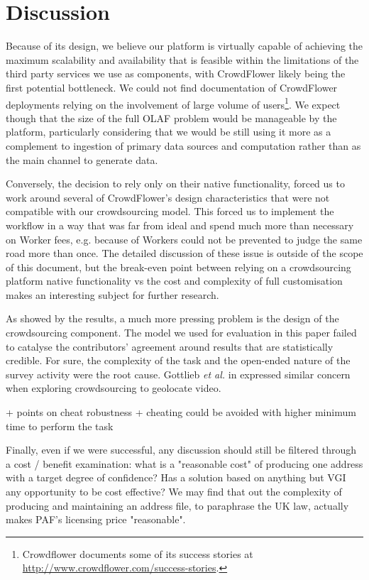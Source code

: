 \section{Discussion}

Because of its design, we believe our platform is virtually capable of achieving the maximum scalability and availability that is feasible within the limitations of the third party services we use as components, with CrowdFlower likely being the first potential bottleneck. We could not find documentation of CrowdFlower deployments relying on the involvement of large volume of users\footnote{Crowdflower documents some of its success stories at \url{http://www.crowdflower.com/success-stories}.}. We expect though that the size of the full OLAF problem would be manageable by the platform, particularly considering that we would be still using it more as a complement to ingestion of primary data sources and computation rather than as the main channel to generate data.

Conversely, the decision to rely only on their native functionality, forced us to work around several of CrowdFlower's design characteristics that were not compatible with our crowdsourcing model. This forced us to implement the workflow in a way that was far from ideal and spend much more than necessary on Worker fees, e.g. because of Workers could not be prevented to judge the same road more than once. The detailed discussion of these issue is outside of the scope of this document, but the break-even point between relying on a crowdsourcing platform native functionality vs the cost and complexity of full customisation makes an interesting subject for further research.

As showed by the results, a much more pressing problem is the design of the crowdsourcing component. The model we used for evaluation in this paper failed to catalyse the contributors' agreement around results that are statistically credible. For sure, the complexity of the task and the open-ended nature of the survey activity were the root cause. Gottlieb {\it et al.} in \cite{Gottlieb:2012fh} expressed similar concern when exploring crowdsourcing to geolocate video.

+ points on cheat robustness
+ cheating could be avoided with higher minimum time to perform the task

Finally, even if we were successful, any discussion should still be filtered through a cost / benefit examination: what is a "reasonable cost" of producing one address with a target degree of confidence? Has a solution based on anything but VGI any opportunity to be cost effective? We may find that out the complexity of producing and maintaining an address file, to paraphrase the UK law, actually makes PAF's licensing price "reasonable".
